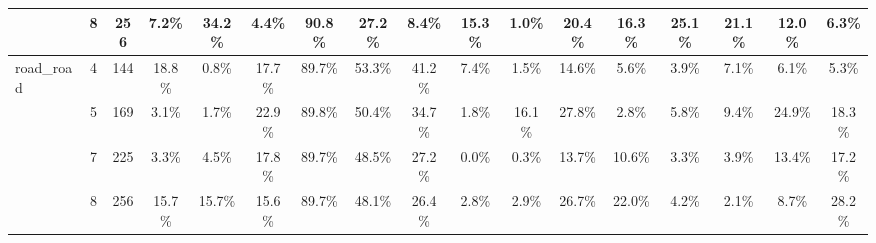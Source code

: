 \begin{tabular}[c]{| l | c | c | c | c | c | c | c | c | c | c | c | c | c | c | c | c |}
 & 8 & 256 & 7.2\%  & 34.2\%  & 4.4\%  & 90.8\%  & 27.2\%  & 8.4\%  & 15.3\%  & 1.0\%  & 20.4\%  & 16.3\%  & 25.1\%  & 21.1\%  & 12.0\%  & 6.3\%   \\ \hline
\multirow{4}{*}{road\_road}  & 4 & 144 & 18.8\%  & 0.8\%  & 17.7\%  & 89.7\%  & 53.3\%  & 41.2\%  & 7.4\%  & 1.5\%  & 14.6\%  & 5.6\%  & 3.9\%  & 7.1\%  & 6.1\%  & 5.3\%   \\ \cline{2-17}
 & 5 & 169 & 3.1\%  & 1.7\%  & 22.9\%  & 89.8\%  & 50.4\%  & 34.7\%  & 1.8\%  & 16.1\%  & 27.8\%  & 2.8\%  & 5.8\%  & 9.4\%  & 24.9\%  & 18.3\%   \\ \cline{2-17}
 & 7 & 225 & 3.3\%  & 4.5\%  & 17.8\%  & 89.7\%  & 48.5\%  & 27.2\%  & 0.0\%  & 0.3\%  & 13.7\%  & 10.6\%  & 3.3\%  & 3.9\%  & 13.4\%  & 17.2\%   \\ \cline{2-17}
 & 8 & 256 & 15.7\%  & 15.7\%  & 15.6\%  & 89.7\%  & 48.1\%  & 26.4\%  & 2.8\%  & 2.9\%  & 26.7\%  & 22.0\%  & 4.2\%  & 2.1\%  & 8.7\%  & 28.2\%   \\ \hline
\end{tabular}